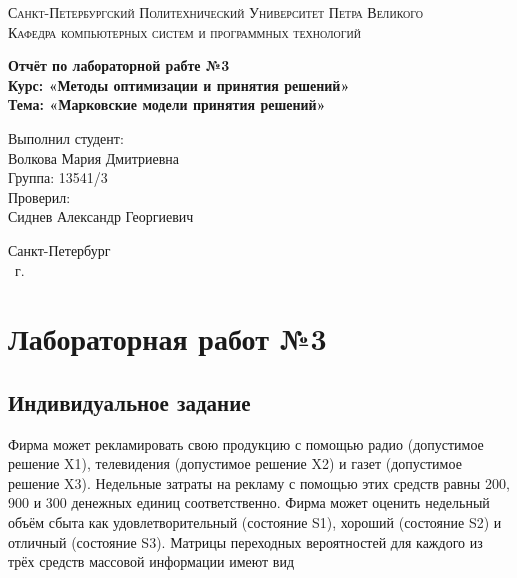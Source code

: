 \documentclass[14pt,a4paper,report]{report}
\begin{document}
\def\contentsname{Содержание}

\begin{titlepage}
	\begin{center}
		\textsc{Санкт-Петербургский Политехнический 
			Университет Петра Великого\\[5mm]
			Кафедра компьютерных систем и программных технологий}
		
		\vfill
		
		\textbf{Отчёт по лабораторной рабте №3\\[3mm]
			Курс: «Методы оптимизации и принятия решений»\\[3mm]
			Тема: «Марковские модели принятия решений»\\[35mm]
			}
	\end{center}
	
	\hfill
	\begin{minipage}{.5\textwidth}
		Выполнил студент:\\[2mm] 
		Волкова Мария Дмитриевна\\
		Группа: 13541/3\\[5mm]
		
		Проверил:\\[2mm] 
		Сиднев Александр Георгиевич
	\end{minipage}
	\vfill
	\begin{center}
		Санкт-Петербург\\ \the\year\ г.
	\end{center}
\end{titlepage}

\tableofcontents
\clearpage

\chapter{Лабораторная работ №3}

\section{Индивидуальное задание}

 Фирма может рекламировать свою продукцию с помощью радио (допустимое решение X1), телевидения (допустимое решение X2) и газет (допустимое решение X3). Недельные затраты на рекламу с помощью этих средств равны 200, 900 и 300 денежных единиц соответственно. Фирма может оценить недельный объём сбыта как удовлетворительный (состояние S1), хороший (состояние S2) и отличный (состояние S3). Матрицы переходных вероятностей для каждого из трёх средств массовой информации имеют вид
\end{document}
